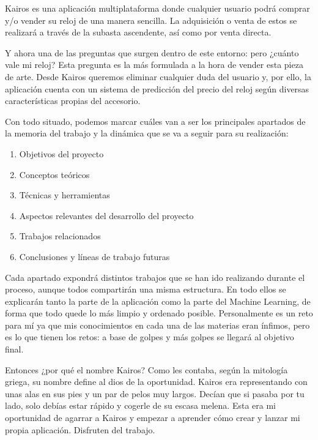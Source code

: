 Kairos es una aplicación multiplataforma donde cualquier usuario podrá comprar y/o vender su reloj de una manera sencilla. La adquisición o venta de estos se realizará a través de la subasta ascendente, así como por venta directa.

Y ahora una de las preguntas que surgen dentro de este entorno: pero ¿cuánto vale mi reloj? Esta pregunta es la más formulada a la hora de vender esta pieza de arte. Desde Kairos queremos eliminar cualquier duda del usuario y, por ello, la aplicación cuenta con un sistema de predicción del precio del reloj según diversas características propias del accesorio.

Con todo situado, podemos marcar cuáles van a ser los principales apartados de la memoria del trabajo y la dinámica que se va a seguir para su realización:

\begin{enumerate}
	\item Objetivos del proyecto
	\item Conceptos teóricos
	\item Técnicas y herramientas
	\item Aspectos relevantes del desarrollo del proyecto
	\item Trabajos relacionados
	\item Conclusiones y líneas de trabajo futuras
\end{enumerate}

Cada apartado expondrá distintos trabajos que se han ido realizando durante el proceso, aunque todos compartirán una misma estructura. En todo ellos se explicarán tanto la parte de la aplicación como la parte del Machine Learning, de forma que todo quede lo más limpio y ordenado posible. Personalmente es un reto para mí ya que mis conocimientos en cada una de las materias eran ínfimos, pero es lo que tienen los retos: a base de golpes y más golpes se llegará al objetivo final.

Entonces ¿por qué el nombre Kairos? Como les contaba, según la mitología griega, su nombre define al dios de la oportunidad. Kairos era representando con unas alas en sus pies y un par de pelos muy largos. Decían que si pasaba por tu lado, solo debías estar rápido y cogerle de su escasa melena. Esta era mi oportunidad de agarrar a Kairos y empezar a aprender cómo crear y lanzar mi propia aplicación. Disfruten del trabajo.
